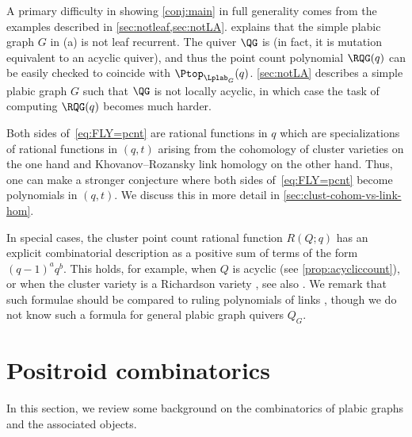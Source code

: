 A primary difficulty in showing \cref{conj:main} in full generality comes from the examples described in \cref{sec:notleaf,sec:notLA}.  explains that the simple plabic graph $G$ in (a) is not leaf recurrent. The quiver $\QG$ is \Louise (in fact, it is mutation equivalent to an acyclic quiver), and thus the point count polynomial $\RQG(q)$ can be easily checked to coincide with $\Ptop_{\Lplab_G}(q)$. \cref{sec:notLA} describes a simple plabic graph $G$ such that $\QG$ is not locally acyclic, in which case the task of computing $\RQG(q)$ becomes much harder.
%

Both sides of~\eqref{eq:FLY=pcnt} are rational functions in $q$ which are specializations of rational functions in $(q,t)$ arising from the cohomology of cluster varieties on the one hand and Khovanov--Rozansky link homology on the other hand. Thus, one can make a stronger conjecture where both sides of~\eqref{eq:FLY=pcnt} become polynomials in $(q,t)$. We discuss this in more detail in \cref{sec:clust-cohom-vs-link-hom}.
%

\begin{remark}
In special cases, the cluster point count rational function $R(Q;q)$ has an explicit combinatorial description as a positive sum of terms of the form $(q-1)^a q^b$.  This holds, for example, when $Q$ is acyclic \cite{LS2} (see \cref{prop:acycliccount}), or when the cluster variety is a Richardson variety \cite{Deodhar}, see also \cite[Section 9]{GL_qtcat}.    We remark that such formulae should be compared to ruling polynomials of links \cite{Ruth}, though we do not know such a formula for general plabic graph quivers $Q_G$.
\end{remark}

\section{Positroid combinatorics}\label{sec:positr-comb}
In this section, we review some background on the combinatorics of plabic graphs and the associated objects.


